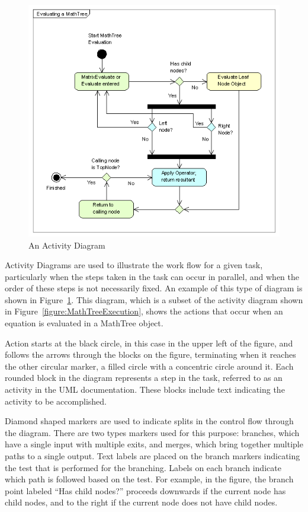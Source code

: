 \begin{figure}[htb]
\begin{center}
\includegraphics[387,356]{Images/UmlActivitySample.png}
\caption{\label{figure:UmlActivityExample}An Activity Diagram}
\end{center}
\end{figure}

Activity Diagrams are used to illustrate the work flow for a given task, particularly when the steps
taken in the task can occur in parallel, and when the order of these steps is not necessarily fixed.
 An example of this type of diagram is shown in Figure~\ref{figure:UmlActivityExample}.  This
diagram, which is a subset of the activity diagram shown in Figure~\ref{figure:MathTreeExecution},
shows the actions that occur when an equation is evaluated in a MathTree object.

Action starts at the black circle, in this case in the upper left of the figure, and follows the
arrows through the blocks on the figure, terminating when it reaches the other circular marker, a
filled circle with a concentric circle around it.  Each rounded block in the diagram represents a
step in the task, referred to as an activity in the UML documentation.  These blocks include text
indicating the activity to be accomplished.

Diamond shaped markers are used to indicate splits in the control flow through the diagram.  There
are two types markers used for this purpose: branches, which have a single input with multiple
exits, and merges, which bring together multiple paths to a single output.  Text labels are placed
on the branch markers indicating the test that is performed for the branching.  Labels on each
branch indicate which path is followed based on the test.  For example, in the figure, the branch
point labeled ``Has child nodes?'' proceeds downwards if the current node has child nodes, and to
the right if the current node does not have child nodes.

